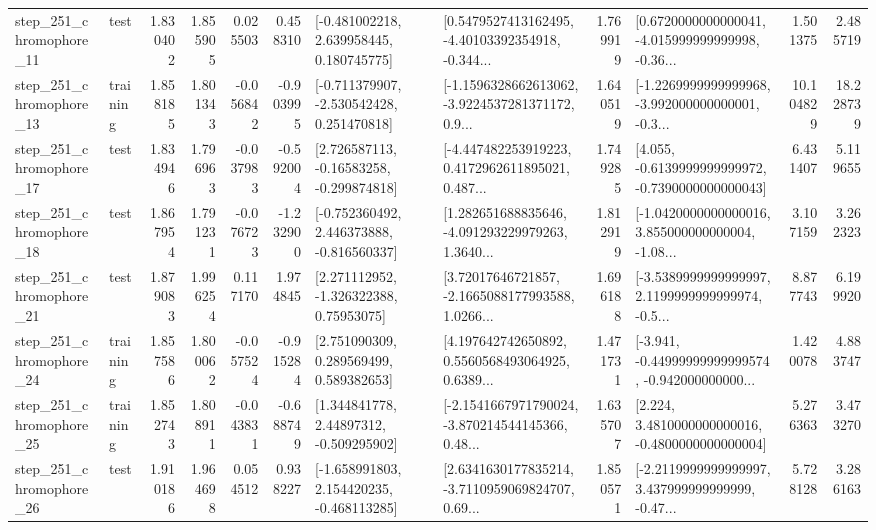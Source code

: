 \begin{tabular}{llrrrrllrlrr}
  step\_251\_chromophore\_11 &      test &      1.830402 &    1.855905 &      0.025503 &  0.458310 &    [-0.481002218, 2.639958445, 0.180745775] &  [0.5479527413162495, -4.40103392354918, -0.344... &       1.769919 &  [0.6720000000000041, -4.015999999999998, -0.36... &            1.501375 &          2.485719 \\
  step\_251\_chromophore\_13 &  training &      1.858185 &    1.801343 &     -0.056842 & -0.903995 &   [-0.711379907, -2.530542428, 0.251470818] &  [-1.1596328662613062, -3.9224537281371172, 0.9... &       1.640519 &  [-1.2269999999999968, -3.992000000000001, -0.3... &           10.104829 &         18.228739 \\
  step\_251\_chromophore\_17 &      test &      1.834946 &    1.796963 &     -0.037983 & -0.592004 &    [2.726587113, -0.16583258, -0.299874818] &  [-4.447482253919223, 0.4172962611895021, 0.487... &       1.749285 &  [4.055, -0.6139999999999972, -0.7390000000000043] &            6.431407 &          5.119655 \\
  step\_251\_chromophore\_18 &      test &      1.867954 &    1.791231 &     -0.076723 & -1.232900 &   [-0.752360492, 2.446373888, -0.816560337] &  [1.282651688835646, -4.091293229979263, 1.3640... &       1.812919 &  [-1.0420000000000016, 3.855000000000004, -1.08... &            3.107159 &          3.262323 \\
  step\_251\_chromophore\_21 &      test &      1.879083 &    1.996254 &      0.117170 &  1.974845 &     [2.271112952, -1.326322388, 0.75953075] &  [3.72017646721857, -2.1665088177993588, 1.0266... &       1.696188 &  [-3.5389999999999997, 2.1199999999999974, -0.5... &            8.877743 &          6.199920 \\
  step\_251\_chromophore\_24 &  training &      1.857586 &    1.800062 &     -0.057524 & -0.915284 &     [2.751090309, 0.289569499, 0.589382653] &  [4.197642742650892, 0.5560568493064925, 0.6389... &       1.471731 &  [-3.941, -0.44999999999999574, -0.942000000000... &            1.420078 &          4.883747 \\
  step\_251\_chromophore\_25 &  training &      1.852743 &    1.808911 &     -0.043831 & -0.688749 &     [1.344841778, 2.44897312, -0.509295902] &  [-2.1541667971790024, -3.870214544145366, 0.48... &       1.635707 &   [2.224, 3.4810000000000016, -0.4800000000000004] &            5.276363 &          3.473270 \\
  step\_251\_chromophore\_26 &      test &      1.910186 &    1.964698 &      0.054512 &  0.938227 &   [-1.658991803, 2.154420235, -0.468113285] &  [2.6341630177835214, -3.7110959069824707, 0.69... &       1.850571 &  [-2.2119999999999997, 3.437999999999999, -0.47... &            5.728128 &          3.286163 \\

\end{tabular}
